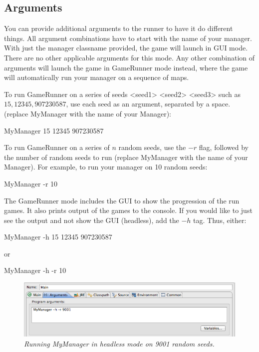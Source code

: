 \documentclass[11pt]{article}
\begin{document}
\subsection{Arguments}
You can provide additional arguments to the runner to have it do different
things. All argument combinations have to start with the name of your manager.
With just the manager classname provided, the game will launch in GUI mode.
There are no other applicable arguments for this mode. Any other combination of
arguments will launch the game in GameRunner mode instead, where the game will
automatically run your manager on a sequence of maps. 

To run GameRunner on a series of seeds <seed1> <seed2> <seed3> such as $15,
12345, 907230587$, use each seed as an argument, separated by a space. (replace
MyManager with the name of your Manager):
\begin{center}
MyManager 15 12345 907230587
\end{center}
To run GameRunner on a series of $n$ random seeds, use the $-r$ flag, followed
by the number of random seeds to run (replace MyManager with the name of your
Manager). For example, to run your manager on 10 random seeds:
\begin{center}
MyManager -r 10
\end{center}
The GameRunner mode includes the GUI to show the progression of the run games.
It also prints output of the games to the console. If you would like to just see
the output and not show the GUI (headless), add the $-h$ tag. Thus, either:
\begin{center}
MyManager -h 15 12345 907230587
\end{center}
or
\begin{center}
MyManager -h -r 10
\end{center}
\begin{figure}[h]
\centerline{\includegraphics[scale=0.65]{args.png}} 
\caption{\em{Running MyManager in headless mode on 9001 random seeds.}}
\end{figure}


\newpage
\end{document}
